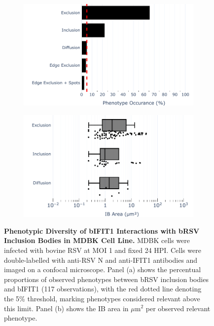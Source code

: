 \begin{figure}
    \begin{subfigure}{0.495\textwidth}
        \caption{}
        \includegraphics[width=1\linewidth]{08. Chapter 3/Figs/02. Infection/01. IFIT1/07. bar_i1_mdbk.pdf} 
    \end{subfigure}
    \begin{subfigure}{0.495\textwidth}
        \caption{}
        \includegraphics[width=1\linewidth]{08. Chapter 3/Figs/02. Infection/01. IFIT1/08. box_i1_mdbk.pdf}
    \end{subfigure}
    \caption[Phenotypic Diversity of bIFIT1 Interactions with bRSV Inclusion Bodies in MDBK Cell Line.]{\textbf{Phenotypic Diversity of bIFIT1 Interactions with bRSV Inclusion Bodies in MDBK Cell Line.} MDBK cells were infected with bovine RSV at MOI 1 and fixed 24 HPI. Cells were double-labelled with anti-RSV N and anti-IFIT1 antibodies and imaged on a confocal microscope. Panel (a) shows the percentual proportions of observed phenotypes between bRSV inclusion bodies and bIFIT1 (117 observations), with the red dotted line denoting the 5\% threshold, marking phenotypes considered relevant above this limit. Panel (b) shows the IB area in \(\mu \mbox{m}^2\) per observed relevant phenotype.}
    \label{fig:Phenotypic Diversity of bIFIT1 Interactions with bRSV Inclusion Bodies in MDBK Cell Line}
\end{figure}

